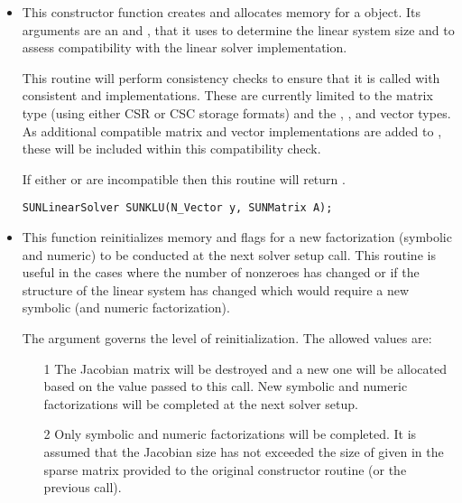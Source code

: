 \begin{itemize}


\item {}

  This constructor function creates and allocates memory for a {\sunlinsolklu}
  object.  Its arguments are an {\nvector} and {\sunmatrix}, that it
  uses to determine the linear system size and to assess compatibility
  with the linear solver implementation. 

  This routine will perform consistency checks to ensure that it is
  called with consistent {\nvector} and {\sunmatrix} implementations.
  These are currently limited to the {\sunmatsparse} matrix type
  (using either CSR or CSC storage formats) and the {\nvecs},
  {\nvecopenmp}, and {\nvecpthreads} vector types.  As additional
  compatible matrix and vector implementations are added to
  {\sundials}, these will be included within this compatibility
  check. 

  If either  or  are incompatible then this routine will
  return .

  \verb|SUNLinearSolver SUNKLU(N_Vector y, SUNMatrix A);|


\item {}

  This function reinitializes memory and flags for a new factorization
  (symbolic and numeric) to be conducted at the next solver setup
  call.  This routine is useful in the cases where the number of
  nonzeroes has changed or if the structure of the linear system has
  changed which would require a new symbolic (and numeric
  factorization). 

  The  argument governs the level of
  reinitialization.  The allowed values are: 
  \begin{itemize}
  \item[1] The Jacobian matrix will be destroyed and a new one will be
    allocated based on the  value passed to this call.  New
    symbolic and numeric factorizations will be completed at the next
    solver setup.
  \item[2] Only symbolic and numeric factorizations will be completed.
    It is assumed that the Jacobian size has not exceeded the size of
     given in the sparse matrix provided to the original
    constructor routine (or the previous  call). 
  \end{itemize}
  

\end{itemize}
